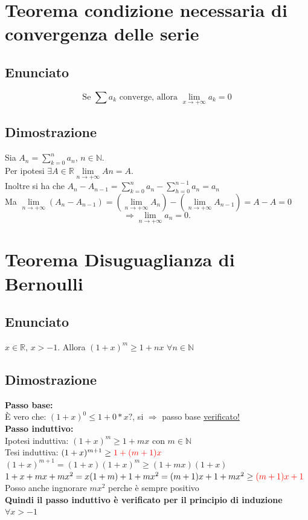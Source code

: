 \documentclass{article}
\newcommand{\R}{\mathbb{R}}
\newcommand{\N}{\mathbb{N}}
\newcommand{\vSpace}{\vspace{1em}}
\begin{document}
\begin{flushleft}
\section{Teorema condizione necessaria di convergenza delle serie}
\subsection{Enunciato}
\[
\text{Se } \sum a_k \text{ converge, allora } \lim\limits_{x \to + \infty}a_k = 0
\]

\subsection{Dimostrazione}
Sia $A_n = \sum\limits_{k = 0}^{n}a_n$, $n \in \N$.\\
Per ipotesi $\exists A \in \R \lim\limits_{n \to + \infty} An = A$. \\
Inoltre si ha che $A_n - A_{n-1} = \sum\limits_{k = 0}^{n}a_n - \sum\limits_{h = 0}^{n-1}a_n = a_n$
\\Ma $\lim\limits_{n \to + \infty}(A_n - A_{n-1}) = (\lim\limits_{n \to + \infty}A_n) - (\lim\limits_{n \to + \infty}A_{n-1}) = A - A = 0$
\[
\Rightarrow \lim\limits_{n \to + \infty}a_n = 0\text{.}
\]

\section{Teorema Disuguaglianza di Bernoulli}
\subsection{Enunciato}
$x \in \R$, $x > - 1$. Allora $(1+x)^m \geq 1 + nx$ $\forall n \in \N$

\subsection{Dimostrazione}
\textbf{Passo base:}\\
È vero che: $(1+x)^0 \leq 1 + 0 * x?$, si $\Rightarrow$ passo base \underline{verificato!}
\\\vSpace
\textbf{Passo induttivo:}\\
Ipotesi induttiva: $(1+x)^m \geq 1 + mx$ \hspace*{1em} con $m \in \N$\\
Tesi induttiva: $(1+x)^{m+1} \geq \textcolor{red}{1 + (m+1)x}$
\\\vSpace
$(1+x)^{m + 1} = (1+x)(1+x)^m \geq (1 + mx)(1+x)$\\
$1 + x + mx + mx^2 = x(1+m)+ 1 + mx^2 = (m+1)x + 1 + mx^2 \geq \textcolor{red}{(m+1)x + 1}$ \hspace*{1em}Posso anche ingnorare $mx^2$ perche è sempre positivo
\\\vSpace
\textbf{Quindi il passo induttivo è verificato per il principio di induzione $\forall x > -1$}


\end{flushleft}
\end{document}
